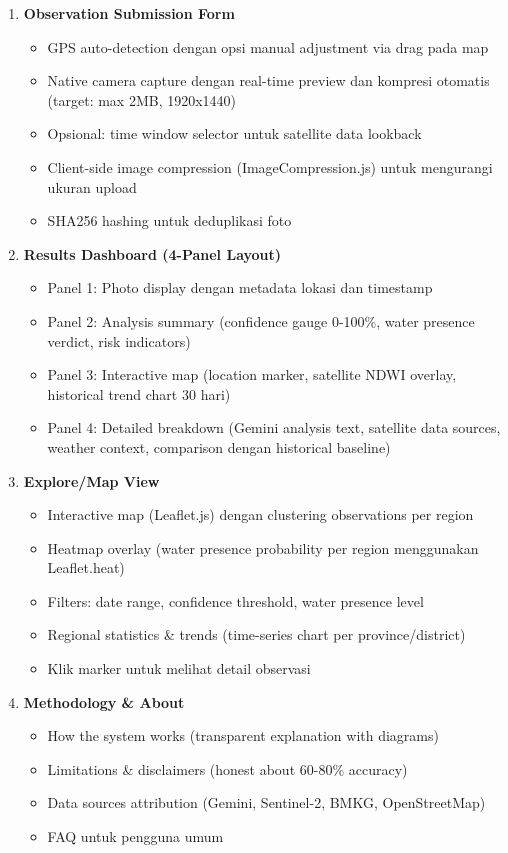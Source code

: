 \documentclass[12pt,a4paper]{article}
\begin{document}
\begin{enumerate}
  \item \textbf{Observation Submission Form}
  \begin{itemize}
    \item GPS auto-detection dengan opsi manual adjustment via drag pada map
    \item Native camera capture dengan real-time preview dan kompresi otomatis (target: max 2MB, 1920x1440)
    \item Opsional: time window selector untuk satellite data lookback
    \item Client-side image compression (ImageCompression.js) untuk mengurangi ukuran upload
    \item SHA256 hashing untuk deduplikasi foto
  \end{itemize}

  \item \textbf{Results Dashboard (4-Panel Layout)}
  \begin{itemize}
    \item Panel 1: Photo display dengan metadata lokasi dan timestamp
    \item Panel 2: Analysis summary (confidence gauge 0-100\%, water presence verdict, risk indicators)
    \item Panel 3: Interactive map (location marker, satellite NDWI overlay, historical trend chart 30 hari)
    \item Panel 4: Detailed breakdown (Gemini analysis text, satellite data sources, weather context, comparison dengan historical baseline)
  \end{itemize}

  \item \textbf{Explore/Map View}
  \begin{itemize}
    \item Interactive map (Leaflet.js) dengan clustering observations per region
    \item Heatmap overlay (water presence probability per region menggunakan Leaflet.heat)
    \item Filters: date range, confidence threshold, water presence level
    \item Regional statistics \& trends (time-series chart per province/district)
    \item Klik marker untuk melihat detail observasi
  \end{itemize}

  \item \textbf{Methodology \& About}
  \begin{itemize}
    \item How the system works (transparent explanation with diagrams)
    \item Limitations \& disclaimers (honest about 60-80\% accuracy)
    \item Data sources attribution (Gemini, Sentinel-2, BMKG, OpenStreetMap)
    \item FAQ untuk pengguna umum
  \end{itemize}
\end{enumerate}
\end{document}
